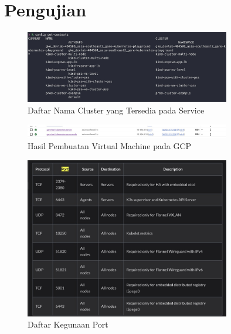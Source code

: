 \chapter{Pengujian}

\begin{figure}[ht]
  \centering
  \includegraphics[width=0.8\textwidth]{resources/chapter-4/pengujian/p00.jpg}
  \caption{Daftar Nama Cluster yang Tersedia pada Service}
  \label{fig:list-cluster-tersedia}
\end{figure}

\begin{figure}[ht]
  \centering
  \includegraphics[width=0.8\textwidth]{resources/chapter-4/pengujian/kube-gcp-01.jpg}
  \caption{Hasil Pembuatan Virtual Machine pada GCP}
  \label{fig:hasil-pembuatan-virtual-machine-gcp}
\end{figure}

\begin{figure}[ht]
  \centering
  \includegraphics[width=0.8\textwidth]{resources/chapter-4/pengujian/kube-gcp-03.jpg}
  \caption{Daftar Kegunaan Port}
  \label{fig:daftar-kegunaan-port}
\end{figure}

